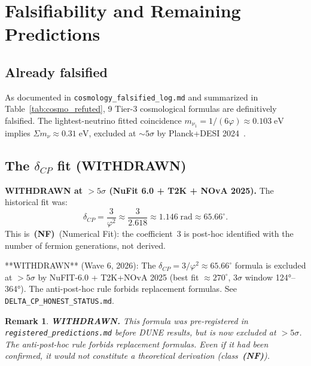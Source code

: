 \documentclass[12pt,a4paper]{article}
\newtheorem{remark}[theorem]{Remark}
\newcommand{\NFclass}{\textbf{(NF)}}
\begin{document}
\section{Falsifiability and Remaining Predictions}
\label{sec:falsifiability}

\subsection{Already falsified}

As documented in \texttt{cosmology\_falsified\_log.md} and summarized in
Table~\ref{tab:cosmo_refuted}, 9 Tier-3 cosmological formulas are definitively
falsified. The lightest-neutrino fitted coincidence \(m_{\nu_1} = 1/(6\varphi) \approx 0.103\;\mathrm{eV}\)
implies \(\Sigma m_\nu \approx 0.31\;\mathrm{eV}\), excluded at \({\sim}5\sigma\) by
Planck+DESI 2024~\cite{DESI:2024mwx}.

\subsection{The \(\delta_{CP}\) fit (\textbf{WITHDRAWN})}

\textbf{WITHDRAWN at $>5\sigma$ (NuFit 6.0 + T2K + NOvA 2025).} The historical fit was:
\begin{equation}
  \delta_{CP} = \frac{3}{\varphi^2} \approx \frac{3}{2.618} \approx 1.146\;\mathrm{rad}
  \approx 65.66^\circ.
  \label{eq:deltaCPpred}
\end{equation}
This is~\NFclass~(Numerical Fit): the coefficient~3 is post-hoc identified with the
number of fermion generations, not derived.

**WITHDRAWN** (Wave 6, 2026): The \(\delta_{CP} = 3/\varphi^2 \approx 65.66^\circ\) formula is excluded at \({>}5\sigma\) by NuFIT-6.0 + T2K+NOvA 2025 (best fit \(\approx 270^\circ\), 3\(\sigma\) window 124°--364°). The anti-post-hoc rule forbids replacement formulas. See \texttt{DELTA\_CP\_HONEST\_STATUS.md}.

\begin{remark}
\textbf{WITHDRAWN.} This formula was pre-registered in \texttt{registered\_predictions.md}
before DUNE results, but is now excluded at ${>}5\sigma$. The anti-post-hoc rule forbids
replacement formulas. Even if it had been confirmed, it would not constitute a theoretical
derivation (class~\NFclass).
\end{remark}
\end{document}
